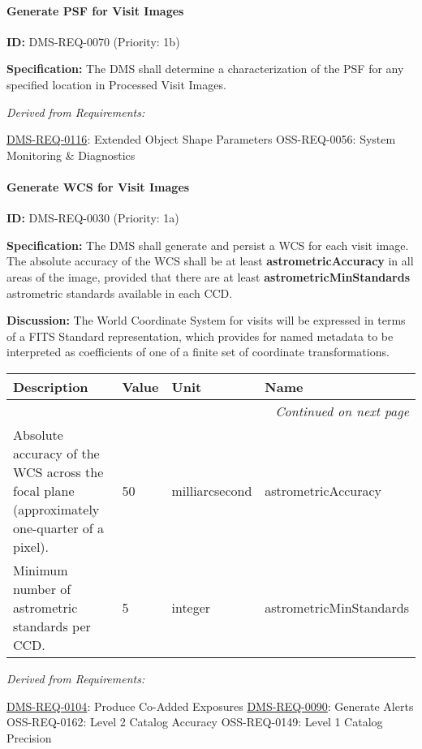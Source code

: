 \documentclass[SE,toc,lsstdraft]{lsstdoc}
\makeatletter
\newcommand{\paramname}[1]{\hspace{0pt}#1}
\newcommand{\unitname}[1]{\hspace{0pt}#1}
\newenvironment{parameters}[0]{%
\setlength\LTleft{0pt}
\setlength\LTright{\fill}
\begin{small}
\begin{longtable}[]{|p{0.49\textwidth}|l|p{0.6in}|p{1.70in}@{}|}

\hline \textbf{Description} & \textbf{Value} & \textbf{Unit} & \textbf{Name} \\ \hline
\endhead

\hline \multicolumn{4}{r}{\emph{Continued on next page}} \\
\endfoot

\hline\hline
\endlastfoot
}{%
\hline
\end{longtable}
\end{small}
}
\makeatother
\begin{document}
\paragraph{Generate PSF for Visit Images}\hfill  %

\label{DMS-REQ-0070}
\textbf{ID:} DMS-REQ-0070 (Priority: 1b)

\textbf{Specification:} The DMS shall determine a characterization of the PSF for any specified location in Processed Visit Images.

\emph{Derived from Requirements:}

\hyperref[DMS-REQ-0116]{DMS-REQ-0116}:
Extended Object Shape Parameters \newline
OSS-REQ-0056:
System Monitoring \& Diagnostics \newline

\paragraph{Generate WCS for Visit Images}\hfill  %

\label{DMS-REQ-0030}
\textbf{ID:} DMS-REQ-0030 (Priority: 1a)

\textbf{Specification:} The DMS shall generate and persist a WCS for each visit image.  The absolute accuracy of the WCS shall be at least \textbf{astrometricAccuracy} in all areas of the image, provided that there are at least \textbf{astrometricMinStandards} astrometric standards available in each CCD.

\textbf{Discussion:} The World Coordinate System for visits will be expressed in terms of a FITS Standard representation, which provides for named metadata to be interpreted as coefficients of one of a finite set of coordinate transformations.

\begin{parameters}
Absolute accuracy of the WCS across the focal plane (approximately one-quarter of a pixel).
&
50
&
\unitname{%
milliarcsecond
}
&
\paramname{%
astrometricAccuracy
} \\\hline
Minimum number of astrometric standards per CCD.
&
5
&
\unitname{%
integer
}
&
\paramname{%
astrometricMinStandards
} \\\hline
\end{parameters}

\emph{Derived from Requirements:}

\hyperref[DMS-REQ-0104]{DMS-REQ-0104}:
Produce Co-Added Exposures \newline
\hyperref[DMS-REQ-0090]{DMS-REQ-0090}:
Generate Alerts \newline
OSS-REQ-0162:
Level 2 Catalog Accuracy \newline
OSS-REQ-0149:
Level 1 Catalog Precision \newline
\end{document}
